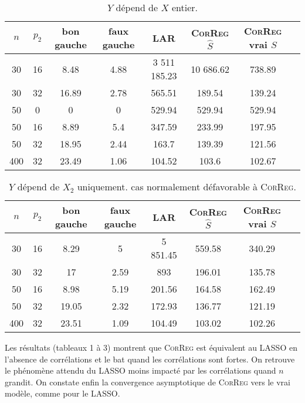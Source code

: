 \documentclass[12pt]{article}
\begin{document}
\begin{table}
\centering
\begin{tabular}{|c|c|c|c|c|c|c|c|}
\hline 
$n$ & $p_2$ & bon gauche & faux gauche    & LAR  &    \textsc{CorReg} $\hat S$& \textsc{CorReg} vrai $S$\\ 
\hline 
30 & 16 & 8.48 & 4.88 & 3 511 185.23 & 10 686.62 & 738.89 \\ 
\hline 
30 & 32 & 16.89 & 2.78 & 565.51 & 189.54 & 139.24\\ 
\hline 
\hline 
50 & 0 & 0 & 0 & 529.94 & 529.94 & 529.94 \\ 
\hline 
50 & 16 & 8.89 & 5.4 & 347.59 & 233.99 & 197.95\\ 
\hline 
50 & 32 & 18.95 & 2.44 & 163.7 & 139.39 & 121.56 \\ 
\hline \hline
400 & 32 & 23.49 & 1.06 & 104.52 & 103.6 & 102.67\\ 
\hline 
\end{tabular} 
\caption{$Y$  dépend  de $X$ entier.} \label{tableMSEsimtout}
\end{table}


\begin{table}
\centering
\begin{tabular}{|c|c|c|c|c|c|c|c|}
\hline 
$n$ & $p_2$ & bon gauche & faux gauche    & LAR  &    \textsc{CorReg} $\hat S$ & \textsc{CorReg} vrai $S$\\ 
\hline 
30 & 16 & 8.29 & 5 & 5 851.45 & 559.58 & 340.29\\ 
\hline 
30 & 32 & 17 & 2.59 & 893 & 196.01 & 135.78 \\ 
\hline 
\hline 
50 & 16 &  8.98 & 5.19 & 201.56 & 164.58 & 162.49\\ 
\hline 
50 & 32 & 19.05 & 2.32 & 172.93 & 136.77 & 121.19\\ 
\hline \hline
400 & 32 & 23.51 & 1.09 & 104.49 & 103.02 & 102.26 \\ 
\hline 
\end{tabular} 
\caption{$Y$  dépend  de $X_2$ uniquement. cas normalement défavorable à \textsc{CorReg}.} \label{tableMSEsimgauche}
\end{table}


Les résultats (tableaux 1 à 3) montrent que \textsc{CorReg} est équivalent au LASSO en l'absence de corrélations et le bat quand les corrélations sont fortes. On retrouve le phénomène attendu du LASSO moins impacté par les corrélations quand $n$ grandit. On constate enfin la convergence asymptotique de \textsc{CorReg} vers le vrai modèle, comme pour le LASSO.
\end{document}

